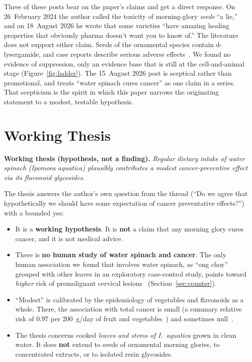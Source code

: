 \documentclass[11pt,a4paper]{article}
\newcommand{\Ia}{\emph{I.~aquatica}}
\begin{document}
\noindent Three of these posts bear on the paper's claims and get a direct response. On 26~February 2024 the author called the toxicity of morning-glory \emph{seeds} ``a lie,'' and on 18~August 2026 he wrote that some varieties ``have amazing healing properties that obviously pharma doesn't want you to know of.'' The literature does not support either claim. Seeds of the ornamental species contain d-lysergamide, and case reports describe serious adverse effects~\cite{juszczak2013}. We found no evidence of suppression, only an evidence base that is still at the cell-and-animal stage (Figure~\ref{fig:ladder}). The 15~August 2026 post is sceptical rather than promotional, and treats ``water spinach cures cancer'' as one claim in a series. That scepticism is the spirit in which this paper narrows the originating statement to a modest, testable hypothesis.

\section{Working Thesis}
\label{sec:thesis}

\begin{thesisbox}
\textbf{Working thesis (hypothesis, not a finding).}\quad
\emph{Regular dietary intake of water spinach (\emph{Ipomoea aquatica}) plausibly contributes a modest cancer-preventive effect via its flavonoid glycosides.}
\end{thesisbox}

\noindent The thesis answers the author's own question from the thread (``Do we agree that hypothetically we should have some expectation of cancer preventative effects?'') with a bounded yes:
\begin{itemize}[itemsep=2pt]
\item It is a \textbf{working hypothesis}. It is \textbf{not} a claim that any morning glory cures cancer, and it is not medical advice.
\item There is \textbf{no human study of water spinach and cancer}. The only human association we found that involves water spinach, as ``ong choy'' grouped with other leaves in an exploratory case-control study, points toward \emph{higher} risk of premalignant cervical lesions~\cite{hernandez2004} (Section~\ref{sec:counter}).
\item ``Modest'' is calibrated by the epidemiology of vegetables and flavonoids as a whole. There, the association with total cancer is small (a summary relative risk of 0.97 per 200~g/day of fruit and vegetables~\cite{aune2017}) and sometimes null~\cite{wang2009,takachi2008}.
\item The thesis concerns cooked \emph{leaves and stems of \Ia{}} grown in clean water. It does \textbf{not} extend to seeds of ornamental morning glories, to concentrated extracts, or to isolated resin glycosides.
\end{itemize}
\end{document}

